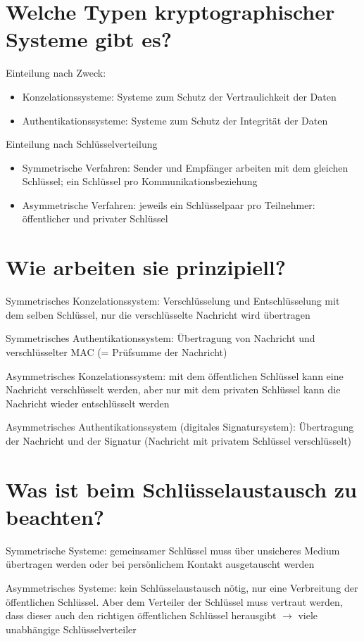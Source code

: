 \documentclass{article}
\begin{document}
	\section*{Welche Typen kryptographischer Systeme gibt es?}
	Einteilung nach Zweck:
	\begin{itemize}
		\item Konzelationssysteme: Systeme zum Schutz der Vertraulichkeit der Daten
		\item Authentikationssysteme: Systeme zum Schutz der Integrität der Daten
	\end{itemize}
	Einteilung nach Schlüsselverteilung
	\begin{itemize}
		\item Symmetrische Verfahren: Sender und Empfänger arbeiten mit dem gleichen Schlüssel; ein Schlüssel pro Kommunikationsbeziehung
		\item Asymmetrische Verfahren: jeweils ein Schlüsselpaar pro Teilnehmer: öffentlicher und privater Schlüssel
	\end{itemize}
	
	\section*{Wie arbeiten sie prinzipiell?}
	Symmetrisches Konzelationssystem: Verschlüsselung und Entschlüsselung mit dem selben Schlüssel, nur die verschlüsselte Nachricht wird übertragen
	
	Symmetrisches Authentikationssystem: Übertragung von Nachricht und verschlüsselter MAC (= Prüfsumme der Nachricht)
	
	Asymmetrisches Konzelationssystem: mit dem öffentlichen Schlüssel kann eine Nachricht verschlüsselt werden, aber nur mit dem privaten Schlüssel kann die Nachricht wieder entschlüsselt werden
	
	Asymmetrisches Authentikationssystem (digitales Signatursystem): Übertragung der Nachricht und der Signatur (Nachricht mit privatem Schlüssel verschlüsselt)

	\section*{Was ist beim Schlüsselaustausch zu beachten?}
	Symmetrische Systeme: gemeinsamer Schlüssel muss über unsicheres Medium übertragen werden oder bei persönlichem Kontakt ausgetauscht werden
	
	Asymmetrisches Systeme: kein Schlüsselaustausch nötig, nur eine Verbreitung der öffentlichen Schlüssel. Aber dem Verteiler der Schlüssel muss vertraut werden, dass dieser auch den richtigen öffentlichen Schlüssel herausgibt $\to$ viele unabhängige Schlüsselverteiler
	
\end{document}

